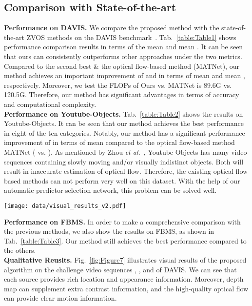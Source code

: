 \documentclass[sigconf]{acmart}
\begin{document}
\subsection{Comparison with State-of-the-art}
\noindent\textbf{Performance on DAVIS.}
We compare the proposed method with the state-of-the-art ZVOS methods on the DAVIS benchmark~\cite{davis16}. Tab.~\ref{table:Table1} shows performance comparison results in terms of the mean  and mean .
It can be seen that ours can consistently outperforms other approaches under the two metrics.  Compared to the second best \& the optical flow-based method (MATNet), our method achieves an important improvement of  and  in terms of mean  and mean , respectively. Moreover, we test the FLOPs of Ours vs. MATNet is 89.6G vs. 120.5G. Therefore, our method has significant advantages in terms of accuracy and computational complexity.\\  
\textbf{Performance on Youtube-Objects.} Tab.~\ref{table:Table2} shows the results on Youtube-Objects. It can be seen that our method achieves the best performance in eight of the ten categories.  Notably, our method has a significant performance improvement of  in terms of mean  compared to the optical flow-based method MATNet ( vs. ). As mentioned by Zhou \textit{et al.}~\cite{MATNet}, Youtube-Objects has many video sequences containing slowly moving and/or visually indistinct objects. Both will result in inaccurate estimation of optical flow. Therefore, the existing optical flow based methods can not perform very well on this dataset. With the help of our automatic predictor selection network, this problem can be solved well.\\
\begin{figure*}
    \texttt{[image: data/visual\_results\_v2.pdf]}\\ \centering
    \caption{Qualitative results on four sequences , ,  and  of DAVIS.} 		
    \label{fig:Figure7}
\end{figure*}
\textbf{Performance on FBMS.} In order to make a comprehensive comparison with the previous methods, we also show the results on FBMS, as shown in Tab.~\ref{table:Table3}. Our method still achieves the best performance compared to the others.\\
\textbf{Qualitative Reuslts.}
 Fig.~\ref{fig:Figure7} illustrates visual results of the proposed algorithm on the challenge video sequences , ,  and  of DAVIS. We can see that each source provides rich location and appearance information. Moreover, depth map can supplement extra contrast information, and the high-quality optical flow can provide clear motion information.  
\end{document}
